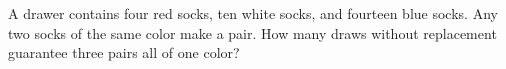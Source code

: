 A drawer contains four red socks, ten white socks, and fourteen blue socks. Any two socks of the same color make a pair. How many draws without replacement guarantee three pairs all of one color?
